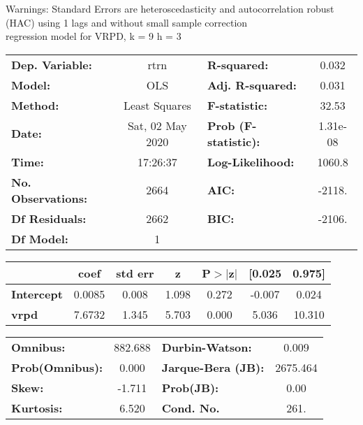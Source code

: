 Warnings: \newline
 [1] Standard Errors are heteroscedasticity and autocorrelation robust (HAC) using 1 lags and without small sample correction\\ 

regression model for VRPD, k = 9 h = 3\begin{center}
\begin{tabular}{lclc}
\toprule
\textbf{Dep. Variable:}    &       rtrn       & \textbf{  R-squared:         } &     0.032   \\
\textbf{Model:}            &       OLS        & \textbf{  Adj. R-squared:    } &     0.031   \\
\textbf{Method:}           &  Least Squares   & \textbf{  F-statistic:       } &     32.53   \\
\textbf{Date:}             & Sat, 02 May 2020 & \textbf{  Prob (F-statistic):} &  1.31e-08   \\
\textbf{Time:}             &     17:26:37     & \textbf{  Log-Likelihood:    } &    1060.8   \\
\textbf{No. Observations:} &        2664      & \textbf{  AIC:               } &    -2118.   \\
\textbf{Df Residuals:}     &        2662      & \textbf{  BIC:               } &    -2106.   \\
\textbf{Df Model:}         &           1      & \textbf{                     } &             \\
\bottomrule
\end{tabular}
\begin{tabular}{lcccccc}
                   & \textbf{coef} & \textbf{std err} & \textbf{z} & \textbf{P$> |$z$|$} & \textbf{[0.025} & \textbf{0.975]}  \\
\midrule
\textbf{Intercept} &       0.0085  &        0.008     &     1.098  &         0.272        &       -0.007    &        0.024     \\
\textbf{vrpd}      &       7.6732  &        1.345     &     5.703  &         0.000        &        5.036    &       10.310     \\
\bottomrule
\end{tabular}
\begin{tabular}{lclc}
\textbf{Omnibus:}       & 882.688 & \textbf{  Durbin-Watson:     } &    0.009  \\
\textbf{Prob(Omnibus):} &   0.000 & \textbf{  Jarque-Bera (JB):  } & 2675.464  \\
\textbf{Skew:}          &  -1.711 & \textbf{  Prob(JB):          } &     0.00  \\
\textbf{Kurtosis:}      &   6.520 & \textbf{  Cond. No.          } &     261.  \\
\bottomrule
\end{tabular}
\end{center}

